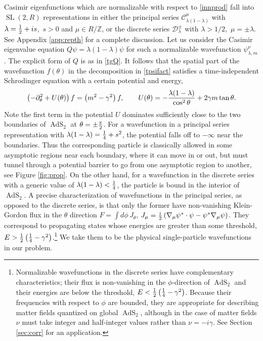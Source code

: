 \documentclass[12pt]{article}
\newcommand{\be}{\begin{equation}}
\newcommand{\ee}{\end{equation}}
\newcommand{\lt}{\left}
\newcommand{\rt}{\right}
\newcommand{\calC}{\mathcal{C}}
\newcommand{\calD}{\mathcal{D}}
\newcommand{\ZZ}{\mathbb{Z}}
\newcommand{\RR}{\mathbb{R}}
\DeclareMathOperator{\tSL}{\widetilde{\mathrm{SL}}}
\DeclareMathOperator{\tAdS}{\widetilde{AdS}}
\newcommand{\tht}{\theta}
\newcommand{\lam}{\lambda}
\newcommand{\ga}{\gamma}
\newcommand{\ov}{\over}
\newcommand{\p}{\partial}
\def\widetilde#1{#1}%
\def\RR{R}
\begin{document}
Casimir eigenfunctions which are normalizable with respect to \eqref{innprod} fall into $\tSL(2,\RR)$ representations in either the principal series $\calC^{\mu}_{\lam(1-\lam)}$ with $\lambda={1 \ov 2}+i s$,\, $s>0$ and $\mu \in \RR/\ZZ$, or the discrete series $\calD_{\lambda}^{\pm}$ with $\lambda>1/2$,\, $\mu=\pm \lam$.\label{princdiscr} See Appendix \ref{app:repth} for a complete discussion. Let us consider the Casimir eigenvalue equation $Q \psi=\lambda(1-\lambda)\psi$ for such a normalizable wavefunction $\psi^{\nu}_{\lambda,m}$. The explicit form of $Q$ is as in \eqref{tgQ}. It follows that the spatial part of the wavefunction $f(\tht)$ in the decomposition in \eqref{tpsifact} satisfies a time-independent Schrodinger equation with a certain potential and energy,
\be \label{pot}
\left( -\p_\tht^2 + U(\tht)\right)f = \left(m^2-\ga^2\right)f, \qquad U(\tht)=-{\lambda(1-\lambda)\ov \cos^2 \tht} + 2 \ga m \tan \tht.
\ee
Note the first term in the potential $U$ dominates sufficiently close to the two boundaries of $\tAdS_2$ at $\tht=\pm{\pi \ov 2}$. For a wavefunction in a principal series representation with $\lam(1-\lam)={1 \ov 4}+s^2$, the potential falls off to $-\infty$ near the boundaries. Thus the corresponding particle is classically allowed in some asymptotic regions near each boundary, where it can move in or out, but must tunnel through a potential barrier to go from one asymptotic region to another, see Figure \ref{fig:prop}. On the other hand, for a wavefunction in the discrete series with a generic value of $\lam(1-\lam)<{1 \ov 4}$, the particle is bound in the interior of $\tAdS_2$. A precise characterization of wavefunctions in the principal series, as opposed to the discrete series, is that only the former have non-vanishing Klein-Gordon flux in the $\tht$ direction $F=\int d\phi\,  J_{\tht}$, $J_{\mu}={i \ov 2}\left(\nabla_\mu \psi^*  \cdot \psi -  \psi^* \nabla_\mu \psi\right)$. They correspond to propagating states whose energies are greater than some threshold, $E > {1 \ov 2}\lt({1 \ov 4}-\ga^2\rt)$.\footnote{Normalizable wavefunctions in the discrete series have complementary characteristics; their flux is non-vanishing in the $\phi$-direction of $\tAdS_2$ and their energies are below the threshold, $E <{1 \ov 2}\lt( {1 \ov 4}-\ga^2\rt)$. Because their frequencies with respect to $\phi$ are bounded, they are appropriate for describing matter fields quantized on global $\tAdS_2$, although in the case of matter fields $\nu$ must take integer and half-integer values rather than $\nu=-i \ga$. See Section \ref{sec:corr} for an application.\label{ftn:discf}} We take them to be the physical single-particle wavefunctions in our problem. 
\end{document}
